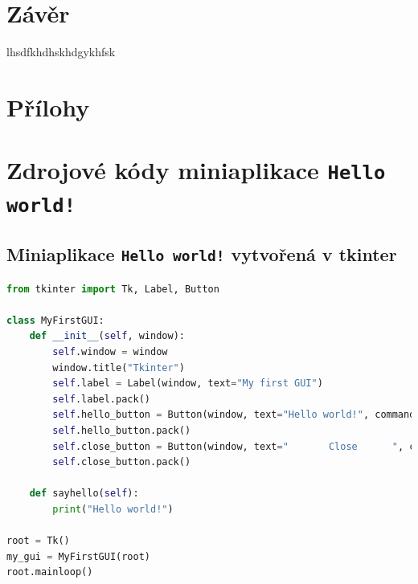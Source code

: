 \documentclass[a4paper, 12pt]{article}
\begin{document}
\clearpage
\newpage
\section{Závěr}
lhsdfkhdhskhdgykhfsk

\clearpage
\newpage


\newpage
\listoffigures

\newpage
\section*{Přílohy}
\appendix
\section{Zdrojové kódy miniaplikace \texttt{Hello world!}}
\label{PrilohaA}
\subsection{Miniaplikace \texttt{Hello world!} vytvořená v tkinter}
\begin{lstlisting}[language=Python]
from tkinter import Tk, Label, Button

class MyFirstGUI:
    def __init__(self, window):
        self.window = window
        window.title("Tkinter")
        self.label = Label(window, text="My first GUI")
        self.label.pack()
        self.hello_button = Button(window, text="Hello world!", command=self.sayhello)
        self.hello_button.pack()
        self.close_button = Button(window, text="       Close      ", command=window.quit)
        self.close_button.pack()

    def sayhello(self):
        print("Hello world!")

root = Tk()
my_gui = MyFirstGUI(root)
root.mainloop()
\end{lstlisting}
\newpage
\end{document}
